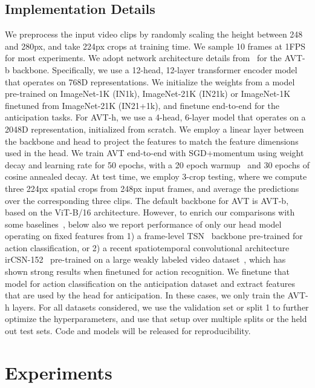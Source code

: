 \documentclass[10pt,twocolumn,letterpaper]{article}
\newcommand{\imnet}{IN1k\xspace}
\newcommand{\imnetii}{IN21k\xspace}
\newcommand{\imnetboth}{IN21+1k\xspace}
\newcommand{\method}{AVT\xspace}
\newcommand{\txBack}{\method{}-b\xspace}
\newcommand{\txHead}{\method{}-h\xspace}
\begin{document}
\subsection{Implementation Details}

We preprocess the input video clips by randomly scaling the height between 248 and 280px, and take 224px crops at training time. We sample 10 frames at 1FPS for most experiments.
We adopt network architecture details from~\cite{dosovitskiy2021image} for the \txBack backbone. Specifically, we use a 12-head, 12-layer transformer encoder model that operates on 768D representations. We initialize the weights from a model pre-trained on ImageNet-1K (\imnet), ImageNet-21K (\imnetii) or ImageNet-1K finetuned from ImageNet-21K (\imnetboth), and finetune end-to-end for the anticipation tasks. For \txHead, we use a 4-head, 6-layer model that operates on a 2048D representation, initialized from scratch. We employ a linear layer between the backbone and head to project the features to match the feature dimensions used in the head. We train \method end-to-end with SGD+momentum using  weight decay and  learning rate for 50 epochs, with a 20 epoch warmup~\cite{goyal2017accurate} and 30 epochs of cosine annealed decay. 
At test time, we employ 3-crop testing, where we compute three 224px  spatial crops from 248px input frames, and average the predictions over the corresponding three clips.
The default backbone for \method is \txBack, based on the ViT-B/16 architecture.  However, to enrich our comparisons with some baselines~\cite{furnari2020rulstm,furnari2019rulstm,sener2020temporal}, below also we report performance of only our head model operating on fixed features from  1) a frame-level TSN~\cite{wang2016tsn} backbone pre-trained for action classification, or 2) a recent spatiotemporal convolutional architecture irCSN-152~\cite{tran2019video} pre-trained on a large weakly labeled video dataset~\cite{ghadiyaram2019large}, which has shown strong results when finetuned for action recognition. We finetune that model for action classification on the anticipation dataset 
and extract features that are used by the head for anticipation. 
In these cases, we only train the \txHead layers.
For all datasets considered, we use the validation set or split 1 to further optimize the hyperparameters, and use that setup over multiple splits or the held out test sets.
Code and models will be released for reproducibility. \section{Experiments}\label{sec:expt}
\end{document}
